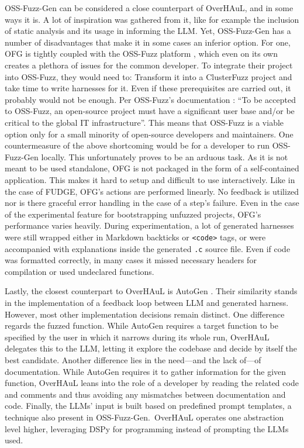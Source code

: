 \documentclass[
  a4paper,
]{scrreprt}
\theoremstyle{definition}
\theoremstyle{remark}
\begin{document}
OSS-Fuzz-Gen \autocite{oss-fuzz-gen} can be considered a close
counterpart of OverHAuL, and in some ways it is. A lot of inspiration
was gathered from it, like for example the inclusion of static analysis
and its usage in informing the LLM. Yet, OSS-Fuzz-Gen has a number of
disadvantages that make it in some cases an inferior option. For one,
OFG is tightly coupled with the OSS-Fuzz platform \autocite{oss-fuzz},
which even on its own creates a plethora of issues for the common
developer. To integrate their project into OSS-Fuzz, they would need to:
Transform it into a ClusterFuzz project \autocite{clusterfuzz} and take
time to write harnesses for it. Even if these prerequisites are carried
out, it probably would not be enough. Per OSS-Fuzz's documentation
\autocite{ossfuzzdocs2025}: ``To be accepted to OSS-Fuzz, an open-source
project must have a significant user base and/or be critical to the
global IT infrastructure''. This means that OSS-Fuzz is a viable option
only for a small minority of open-source developers and maintainers. One
countermeasure of the above shortcoming would be for a developer to run
OSS-Fuzz-Gen locally. This unfortunately proves to be an arduous task.
As it is not meant to be used standalone, OFG is not packaged in the
form of a self-contained application. This makes it hard to setup and
difficult to use interactively. Like in the case of FUDGE, OFG's actions
are performed linearly. No feedback is utilized nor is there graceful
error handling in the case of a step's failure. Even in the case of the
experimental feature for bootstrapping unfuzzed projects, OFG's
performance varies heavily. During experimentation, a lot of generated
harnesses were still wrapped either in Markdown backticks or
\texttt{\textless{}code\textgreater{}} tags, or were accompanied with
explanations inside the generated \texttt{.c} source file. Even if code
was formatted correctly, in many cases it missed necessary headers for
compilation or used undeclared functions.

Lastly, the closest counterpart to OverHAuL is AutoGen
\autocite{sun2024}. Their similarity stands in the implementation of a
feedback loop between LLM and generated harness. However, most other
implementation decisions remain distinct. One difference regards the
fuzzed function. While AutoGen requires a target function to be
specified by the user in which it narrows during its whole run, OverHAuL
delegates this to the LLM, letting it explore the codebase and decide by
itself the best candidate. Another difference lies in the need---and the
lack of---of documentation. While AutoGen requires it to gather
information for the given function, OverHAuL leans into the role of a
developer by reading the related code and comments and thus avoiding any
mismatches between documentation and code. Finally, the LLMs' input is
built based on predefined prompt templates, a technique also present in
OSS-Fuzz-Gen.~OverHAuL operates one abstraction level higher, leveraging
DSPy \autocite{dspy} for programming instead of prompting the LLMs used.
\end{document}
